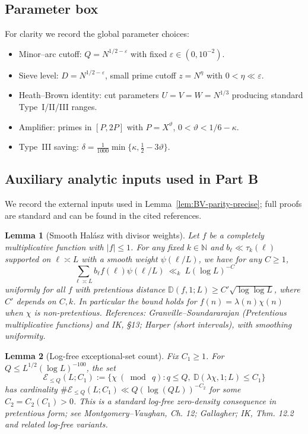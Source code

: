 \documentclass[11pt]{article}
\newtheorem{lemma}{Lemma}[part]
\theoremstyle{definition}
\theoremstyle{remark}
\numberwithin{equation}{part}
\begin{document}
\subsection{Parameter box}

For clarity we record the global parameter choices:
\begin{itemize}
	\item Minor--arc cutoff: $Q=N^{1/2-\varepsilon}$ with fixed $\varepsilon\in(0,10^{-2})$.
	\item Sieve level: $D=N^{1/2-\varepsilon}$, small prime cutoff $z=N^\eta$ with $0<\eta\ll\varepsilon$.
	\item Heath--Brown identity: cut parameters $U=V=W=N^{1/3}$ producing standard Type~I/II/III ranges.
	\item Amplifier: primes in $[P,2P]$ with $P=X^\vartheta$, $0<\vartheta<1/6-\kappa$.
	\item Type~III saving: $\delta=\tfrac{1}{1000}\min\{\kappa,\tfrac12-3\vartheta\}$.
\end{itemize}
\subsection{Auxiliary analytic inputs used in Part B}

We record the external inputs used in Lemma~\ref{lem:BV-parity-precise}; full proofs are standard and can be found in the cited references.

\begin{lemma}[Smooth Hal\'asz with divisor weights]\label{lem:halasz-smooth}
	Let $f$ be a completely multiplicative function with $|f|\le 1$. For any fixed $k\in\mathbb N$ and $b_\ell\ll \tau_k(\ell)$ supported on $\ell\asymp L$ with a smooth weight $\psi(\ell/L)$, we have for any $C\ge 1$,
	\[
		\sum_{\ell\asymp L} b_\ell f(\ell)\psi(\ell/L)\ \ll_{k}\ L(\log L)^{-C}
	\]
	uniformly for all $f$ with pretentious distance $\mathbb D(f,1;L)\ge C'\sqrt{\log\log L}$, where $C'$ depends on $C,k$. In particular the bound holds for $f(n)=\lambda(n)\chi(n)$ when $\chi$ is non-pretentious. References: Granville--Soundararajan (Pretentious multiplicative functions) and IK, §13; Harper (short intervals), with smoothing uniformity.
\end{lemma}

\begin{lemma}[Log-free exceptional-set count]\label{lem:logfree-density}
	Fix $C_1\ge 1$. For $Q\le L^{1/2}(\log L)^{-100}$, the set
	\[
		\mathcal E_{\le Q}(L;C_1):=\{\chi\ (\bmod\ q): q\le Q,\ \mathbb D(\lambda\chi,1;L)\le C_1\}
	\]
	has cardinality $\#\mathcal E_{\le Q}(L;C_1)\ll Q(\log (QL))^{-C_2}$ for some $C_2=C_2(C_1)>0$. This is a standard log-free zero-density consequence in pretentious form; see Montgomery--Vaughan, Ch. 12; Gallagher; IK, Thm. 12.2 and related log-free variants.
\end{lemma}
\end{document}
